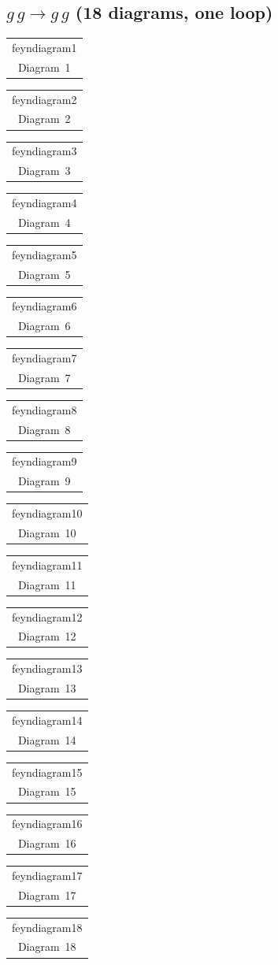 \documentclass[a4paper,11pt]{article}
\makeatletter
\newcommand{\FeynDiagram}[1]{\csname feyndiagram#1\endcsname}
\newcommand{\FeynCell}[1]{\begin{tabular}[t]{@{}c@{}}\FeynDiagram{#1}\\[1ex]\small Diagram~#1\end{tabular}}
\makeatother
\begin{document}
\setlength{\parindent}{0pt}
\subsection*{$g\,g \to g\,g$ \normalfont(18 diagrams, one loop)}
\noindent \FeynCell{1}\hfill \FeynCell{2}\hfill \FeynCell{3}\par\bigskip
\noindent \FeynCell{4}\hfill \FeynCell{5}\hfill \FeynCell{6}\par\bigskip
\noindent \FeynCell{7}\hfill \FeynCell{8}\hfill \FeynCell{9}\par\bigskip
\noindent \FeynCell{10}\hfill \FeynCell{11}\hfill \FeynCell{12}\par\bigskip
\noindent \FeynCell{13}\hfill \FeynCell{14}\hfill \FeynCell{15}\par\bigskip
\noindent \FeynCell{16}\hfill \FeynCell{17}\hfill \FeynCell{18}\par\bigskip
\end{document}
